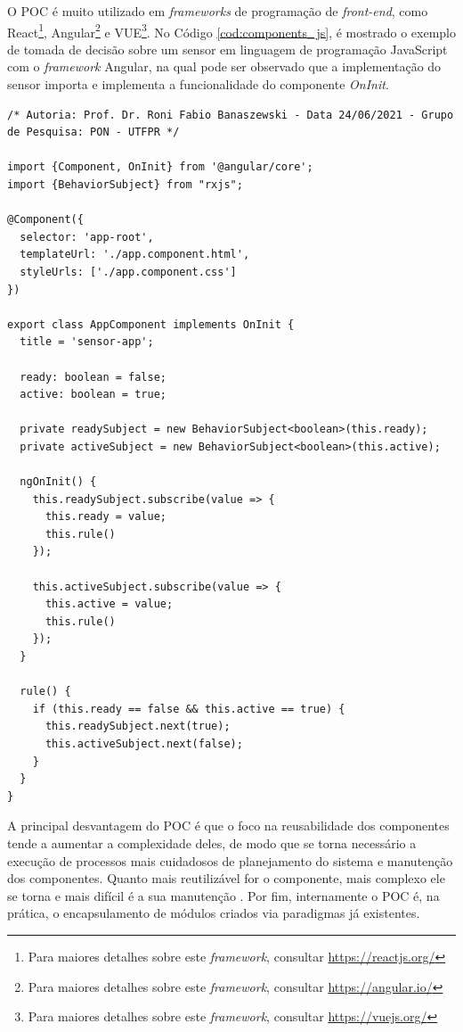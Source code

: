O POC é muito utilizado em \textit{frameworks} de programação de
\textit{front-end}, como React\footnote{Para maiores detalhes sobre este
\textit{framework}, consultar \url{https://reactjs.org/}}, Angular\footnote{Para
maiores detalhes sobre este \textit{framework}, consultar
\url{https://angular.io/}} e VUE\footnote{Para maiores detalhes sobre este
\textit{framework}, consultar \url{https://vuejs.org/}}. No Código
\ref{cod:components_js}, é mostrado o exemplo de tomada de decisão sobre um
sensor em linguagem de programação JavaScript com o \textit{framework} Angular,
na qual pode ser observado que a implementação do sensor importa e implementa a
funcionalidade do componente \textit{OnInit}.

\begin{lstlisting}[caption = {Exemplo de aplicação de sensor em React no POC},
source = {Autoria própria}, float=htb,
label  = {cod:components_js}]
/* Autoria: Prof. Dr. Roni Fabio Banaszewski - Data 24/06/2021 - Grupo de Pesquisa: PON - UTFPR */ 

import {Component, OnInit} from '@angular/core';
import {BehaviorSubject} from "rxjs";

@Component({
  selector: 'app-root',
  templateUrl: './app.component.html',
  styleUrls: ['./app.component.css']
})

export class AppComponent implements OnInit {
  title = 'sensor-app';

  ready: boolean = false;
  active: boolean = true;

  private readySubject = new BehaviorSubject<boolean>(this.ready);
  private activeSubject = new BehaviorSubject<boolean>(this.active);

  ngOnInit() {
    this.readySubject.subscribe(value => {
      this.ready = value;
      this.rule()
    });

    this.activeSubject.subscribe(value => {
      this.active = value;
      this.rule()
    });
  }

  rule() {
    if (this.ready == false && this.active == true) {
      this.readySubject.next(true);
      this.activeSubject.next(false);
    }
  }
}
\end{lstlisting}

A principal desvantagem do POC é que o foco na reusabilidade dos componentes
tende a aumentar a complexidade deles, de modo que se torna necessário a
execução de processos mais cuidadosos de planejamento do sistema e manutenção
dos componentes. Quanto mais reutilizável for o componente, mais complexo ele se
torna e mais difícil é a sua manutenção \cite{crnkovic_2002}. Por fim,
internamente o POC é, na prática, o encapsulamento de módulos criados via
paradigmas já existentes.

